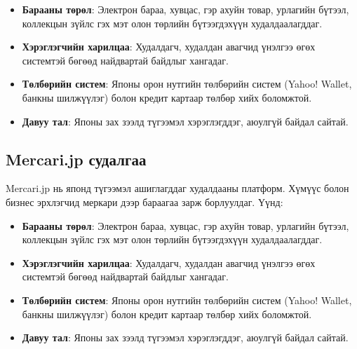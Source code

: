 \begin{itemize}
    \item \textbf{Барааны төрөл}: Электрон бараа, хувцас, гэр ахуйн товар, урлагийн бүтээл, коллекцын зүйлс гэх мэт олон төрлийн бүтээгдэхүүн худалдаалагддаг.
    \item \textbf{Хэрэглэгчийн харилцаа}: Худалдагч, худалдан авагчид үнэлгээ өгөх системтэй бөгөөд найдвартай байдлыг хангадаг.
    \item \textbf{Төлбөрийн систем}: Японы орон нутгийн төлбөрийн систем (Yahoo! Wallet, банкны шилжүүлэг) болон кредит картаар төлбөр хийх боломжтой.
    \item \textbf{Давуу тал}: Японы зах зээлд түгээмэл хэрэглэгддэг, аюулгүй байдал сайтай.
 
\end{itemize}
\subsection{Mercari.jp судалгаа}
Mercari.jp нь японд түгээмэл ашиглагддаг худалдааны платформ. Хүмүүс болон бизнес эрхлэгчид меркари дээр бараагаа зарж борлуулдаг. Үүнд:

\begin{itemize}
    \item \textbf{Барааны төрөл}: Электрон бараа, хувцас, гэр ахуйн товар, урлагийн бүтээл, коллекцын зүйлс гэх мэт олон төрлийн бүтээгдэхүүн худалдаалагддаг.
    \item \textbf{Хэрэглэгчийн харилцаа}: Худалдагч, худалдан авагчид үнэлгээ өгөх системтэй бөгөөд найдвартай байдлыг хангадаг.
    \item \textbf{Төлбөрийн систем}: Японы орон нутгийн төлбөрийн систем (Yahoo! Wallet, банкны шилжүүлэг) болон кредит картаар төлбөр хийх боломжтой.
    \item \textbf{Давуу тал}: Японы зах зээлд түгээмэл хэрэглэгддэг, аюулгүй байдал сайтай.
 
\end{itemize}

